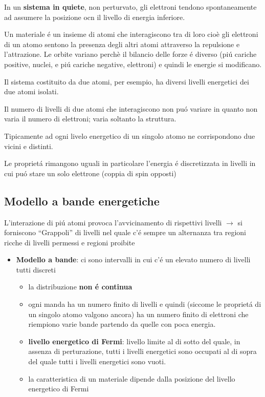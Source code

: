 In un \textbf{sistema in quiete}, non perturvato, gli elettroni tendono spontaneamente ad assumere la posizione ocn il livello di energia inferiore.

Un materiale \'e un insieme di atomi che interagiscono tra di loro cio\`e gli elettroni di un atomo sentono la presenza degli altri atomi attraverso la repulsione e l'attrazione. Le orbite variano perch\`e il bilancio delle forze \'e diverso (pi\'u cariche positive, nuclei, e pi\'u cariche negative, elettroni) e quindi le energie si modificano.

Il sistema costituito da due atomi, per esempio, ha diversi livelli energetici dei due atomi isolati.


Il numero di livelli di due atomi che interagiscono non pu\'o variare in quanto non varia il numero di elettroni; varia soltanto la struttura.

Tipicamente ad ogni livelo energetico di un singolo atomo ne corrispondono due vicini e distinti.

Le propriet\'a rimangono uguali in particolare l'energia \'e discretizzata in livelli in cui pu\'o stare un solo elettrone (coppia di spin opposti)

\subsection{Modello a bande energetiche}

L'interazione di pi\'u atomi provoca l'avvicinamento di rispettivi livelli $\rightarrow$ si forniscono ``Grappoli'' di livelli nel quale c'\'e sempre un alternanza tra regioni ricche di livelli permessi e regioni proibite

\begin{itemize}
    \item \textbf{Modello a bande}: ci sono intervalli in cui c'\'e un elevato numero di livelli tutti discreti
        \begin{itemize}
            \item la distribuzione \textbf{non \'e continua}
            \item ogni manda ha un numero finito di livelli e quindi (siccome le propriet\'a di un singolo atomo valgono ancora) ha un numero finito di elettroni che riempiono varie bande partendo da quelle con poca energia.
            \item \textbf{livello energetico di Fermi}: livello limite al di sotto del quale, in assenza di perturazione, tutti i livelli energetici sono occupati al di sopra del quale tutti i livelli energetici sono vuoti.
            \item la caratteristica di un materiale dipende dalla posizione del livello energetico di Fermi
        \end{itemize}
\end{itemize}

